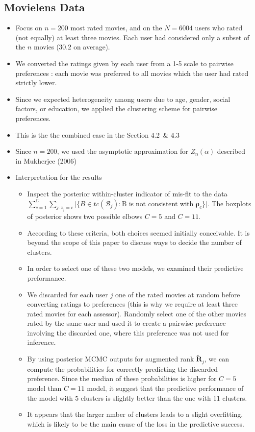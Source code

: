 \documentclass[12pt]{article}
\begin{document}
\subsection{Movielens Data}
\begin{itemize}
    \item Focus on $n=200$ most rated movies, and on the $N=6004$ users who rated (not equally) at least three movies. Each user had considered only a subset of the $n$ movies (30.2 on average).
    \item We converted the ratings given by each user from a 1-5 scale to pairwise preferences : each movie was preferred to all movies which the user had rated strictly lower.
    \item Since we expected heterogeneity among users due to age, gender, social factors, or education, we applied the clustering scheme for pairwise preferences.
    \item This is the the combined case in the Section 4.2 \,\& 4.3
    \item Since $n=200$, we used the asymptotic approximation for $Z_n(\alpha)$ described in Mukherjee (2006) 
    \item Interpretation for the results
    \begin{itemize}
        \item Inspect the posterior within-cluster indicator of mis-fit to the data \\  $\sum_{c=1}^C \sum_{j : z_j=c} \big|\{B\in tc(\mathcal{B}_j):$B is not consistent with $\boldsymbol{\rho}_c\} \big|$. The boxplots of posterior shows two possible elbows $C=5$ and $C=11$.
        \item According to these criteria, both choices seemed initially conceivable. It is beyond the scope of this paper to discuss ways to decide the number of clusters. 
        \item In order to select one of these two models, we examined their predictive preformance. 
        \item We discarded for each user $j$ one of the rated movies at random  before converting ratings to preferences (this is why we require at least three rated movies for each assessor). Randomly select one of the other movies rated by the same user and used it to create a pairwise preference involving the discarded one, where this preference was not used for inference. 
        \item By using posterior MCMC outputs for augmented rank $\tilde{\mathbf{R}}_j$, we can compute the probabilities for correctly predicting the discarded preference. Since the median of these probabilities is higher for $C=5$ model than $C=11$ model, it suggest that the predictive performance of the model with 5 clusters is slightly better than the one with 11 clusters. 
        \item It appears that the larger nmber of clusters leads to a slight overfitting, which is likely to be the main cause of the loss in the predictive success. 
    \end{itemize}
\end{itemize}
\end{document}

